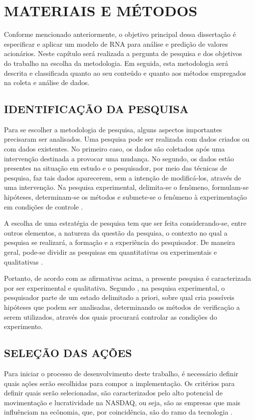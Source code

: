 
\chapter{MATERIAIS E MÉTODOS}\label{ch:materiais-metodos}
Conforme mencionado anteriormente, o objetivo principal dessa dissertação é especificar e aplicar um modelo de RNA para análise e predição de valores acionários. Neste capítulo será realizada a pergunta de pesquisa e dos objetivos do trabalho na escolha da metodologia. Em seguida, esta metodologia será descrita e classificada quanto ao seu conteúdo e quanto aos métodos empregados na coleta e análise de dados.

\section{IDENTIFICAÇÃO DA PESQUISA}

Para se escolher a metodologia de pesquisa, alguns aspectos importantes precisaram ser analisados. Uma pesquisa pode ser realizada com dados criados ou com dados existentes. No primeiro caso, os dados são coletados após uma intervenção destinada a provocar uma mudança. No segundo, os dados estão presentes na situação em estudo e o pesquisador, por meio das técnicas de pesquisa, faz tais dados aparecerem, sem a intenção de modificá-los, através de uma intervenção. Na pesquisa experimental, delimita-se o fenômeno, formulam-se hipóteses, determinam-se os métodos e submete-se o fenômeno à experimentação em condições de controle \cite{laville}.

A escolha de uma estratégia de pesquisa tem que ser feita considerando-se, entre outros elementos, a natureza da questão da pesquisa, o contexto no qual a pesquisa se realizará, a formação e a experiência do pesquisador. De maneira geral, pode-se dividir as pesquisas em quantitativas ou experimentais e qualitativas \cite{laville}.

Portanto, de acordo com as afirmativas acima, a presente pesquisa é caracterizada por ser experimental e qualitativa. Segundo , na pesquisa experimental, o pesquisador parte de um estado delimitado a priori, sobre qual cria possíveis hipóteses que podem ser analisadas, determinando os métodos de verificação a serem utilizados, através dos quais procurará controlar as condições do experimento.

\section{SELEÇÃO DAS AÇÕES}
Para iniciar o processo de desenvolvimento deste trabalho, é necessário definir quais ações serão escolhidas para compor a implementação. Os critérios para definir quais serão selecionadas, são caracterizados pelo alto potencial de movimentação e lucratividade na NASDAQ, ou seja, são as empresas que mais influênciam na ecônomia, que, por coincidência, são do ramo da tecnologia \cite{christie}.

